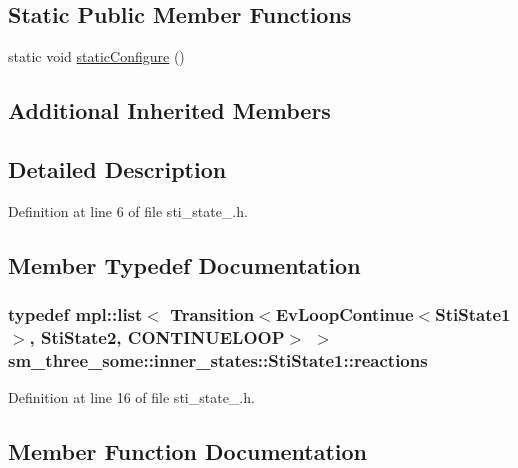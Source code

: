 \subsection*{Static Public Member Functions}
\begin{DoxyCompactItemize}
\item 
static void \hyperlink{structsm__three__some_1_1inner__states_1_1StiState1_a1caa7fccefcc671ace99ebecc534007f}{static\+Configure} ()
\end{DoxyCompactItemize}
\subsection*{Additional Inherited Members}


\subsection{Detailed Description}


Definition at line 6 of file sti\+\_\+state\+\_.\+h.



\subsection{Member Typedef Documentation}
\subsubsection[{\texorpdfstring{reactions}{reactions}}]{\setlength{\rightskip}{0pt plus 5cm}typedef mpl\+::list$<$ Transition$<$Ev\+Loop\+Continue$<${\bf Sti\+State1}$>$, {\bf Sti\+State2}, C\+O\+N\+T\+I\+N\+U\+E\+L\+O\+OP$>$ $>$ {\bf sm\+\_\+three\+\_\+some\+::inner\+\_\+states\+::\+Sti\+State1\+::reactions}}\hypertarget{structsm__three__some_1_1inner__states_1_1StiState1_a3880ea2992d3e5153deec7adafc52d8e}{}\label{structsm__three__some_1_1inner__states_1_1StiState1_a3880ea2992d3e5153deec7adafc52d8e}


Definition at line 16 of file sti\+\_\+state\+\_.\+h.



\subsection{Member Function Documentation}
